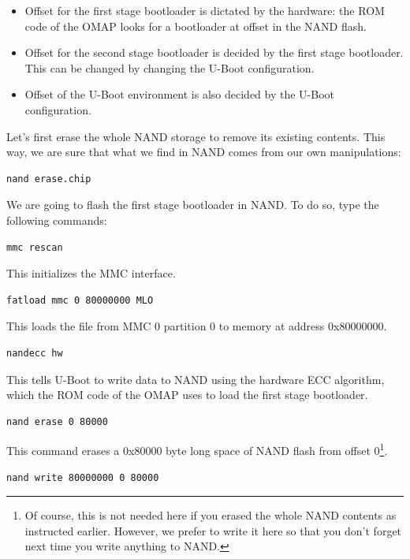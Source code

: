 \begin{itemize}
\item Offset  for the first stage bootloader is dictated by
  the hardware: the ROM code of the OMAP looks for a bootloader at
  offset  in the NAND flash.
\item Offset  for the second stage bootloader is decided
  by the first stage bootloader. This can be changed by changing the
  U-Boot configuration.
\item Offset  of the U-Boot environment is also decided
  by the U-Boot configuration.
\end{itemize}

Let's first erase the whole NAND storage to remove its existing
contents. This way, we are sure that what we find in NAND comes from
our own manipulations:

\begin{verbatim}
nand erase.chip
\end{verbatim}

We are going to flash the first stage bootloader in NAND. To do so,
type the following commands:

\begin{verbatim}
mmc rescan
\end{verbatim}

This initializes the MMC interface.

\begin{verbatim}
fatload mmc 0 80000000 MLO
\end{verbatim}
This loads the file from MMC 0 partition 0 to memory at address
0x80000000.

\begin{verbatim}
nandecc hw
\end{verbatim}

This tells U-Boot to write data to NAND using the hardware ECC
algorithm, which the ROM code of the OMAP uses to load the first stage
bootloader.

\begin{verbatim}
nand erase 0 80000
\end{verbatim}

This command erases a 0x80000 byte long space of NAND flash from
offset 0\footnote{Of course, this is not needed here if you erased the
  whole NAND contents as instructed earlier. However, we prefer to
  write it here so that you don't forget next time you write anything
  to NAND.}.

\begin{verbatim}
nand write 80000000 0 80000
\end{verbatim}

